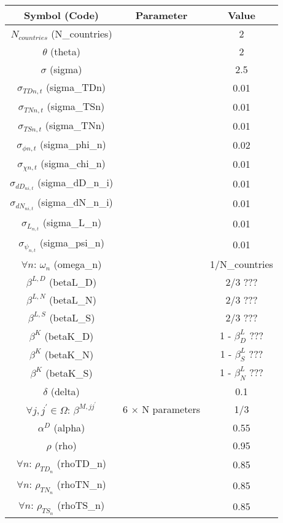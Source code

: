 \documentclass[12pt, bibtotoc, tablecaptionabove, figurecaptionabove, fleqn]{article}
\begin{document}
{\small
\begin{center}
	\begin{tabular}{ccc} 
		\hline
		\hline
		Symbol (Code) & Parameter & Value \\ 
		\hline
		$N_{countries}$ (N\_{countries}) & & 2 \\ 		
		$\theta$ (theta) & & 2 \\ 
		$\sigma$ (sigma) & & 2.5 \\
		$\sigma_{TDn,t}$ (sigma\_TDn) & & 0.01 \\
		$\sigma_{TNn,t}$ (sigma\_TSn) & & 0.01 \\
		$\sigma_{TSn,t}$ (sigma\_TNn) & & 0.01 \\
		$\sigma_{\phi n,t}$ (sigma\_phi\_n) & & 0.02 \\				$\sigma_{\chi n,t}$ (sigma\_chi\_n) & & 0.01 \\
                $\sigma_{dD_{ni,t}}$ (sigma\_dD\_n\_i) & & 0.01 \\
                $\sigma_{dN_{ni,t}}$ (sigma\_dN\_n\_i) & & 0.01 \\                
                $\sigma_{L_{n,t}}$ (sigma\_L\_n) & & 0.01 \\
                $\sigma_{\psi_{n,t}}$ (sigma\_psi\_n) & & 0.01 \\		                
		$\forall n$: $\omega_n$ (omega\_n) & & 1/N\_{countries}\\
		$\beta^{L,D}$ (betaL\_D) & & 2/3 ??? \\
                $\beta^{L,N}$ (betaL\_N) & & 2/3 ???\\
                $\beta^{L,S}$ (betaL\_S) & & 2/3 ??? \\                
		$\beta^K$ (betaK\_D) & & 1 - $\beta^L_D$ ???\\
		$\beta^K$ (betaK\_N) & & 1 - $\beta^L_S$ ???\\
		$\beta^K$ (betaK\_S) & & 1 - $\beta^L_N$ ???\\		
		$\delta$ (delta) & & 0.1 \\
		$\forall j, j^{\prime} \in \Omega$: $\beta^{M, j j^{\prime}}$ & 6 $\times$ N parameters & 1/3\\
 		$\alpha^D$ (alpha) & & 0.55 \\ 
		$\rho$ (rho) & & 0.95 \\ 
		$\forall n$: $\rho_{TD_n}$ (rhoTD\_n) & & 0.85 \\ 
		$\forall n$: $\rho_{TN_n}$ (rhoTN\_n) & & 0.85 \\ 
		$\forall n$: $\rho_{TS_n}$ (rhoTS\_n) & & 0.85 \\ 		

\end{tabular}
\end{center}}
\end{document}
